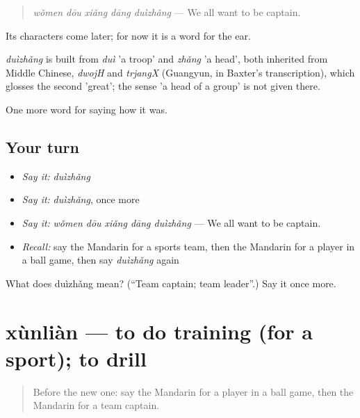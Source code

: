 \begin{quote}
\emph{wǒmen dōu xiǎng dāng duìzhǎng} — We all want to be captain.
\end{quote}

Its characters come later; for now it is a word for the ear.

\begin{cousinweb}
\emph{duìzhǎng} is built from \emph{duì} 'a troop' and \emph{zhǎng} 'a head', both inherited from Middle Chinese, \emph{dwojH} and \emph{trjangX} (Guangyun, in Baxter's transcription), which glosses the second 'great'; the sense 'a head of a group' is not given there.
\end{cousinweb}

\begin{grammarlens}[title={What you've built}]
One more word for saying how it was.
\end{grammarlens}

\subsection*{Your turn}
\begin{itemize}
\raggedright
  \item \emph{Say it:} \emph{duìzhǎng}
  \item \emph{Say it:} \emph{duìzhǎng}, once more
  \item \emph{Say it:} \emph{wǒmen dōu xiǎng dāng duìzhǎng} — We all want to be captain.
  \item \emph{Recall:} say the Mandarin for a sports team, then the Mandarin for a player in a ball game, then say \emph{duìzhǎng} again
\end{itemize}

\begin{tcolorbox}[breakable,colback=teal!4,colframe=teal!35!black,title={Before you move on}]
What does duìzhǎng mean? (\textquotedblleft{}Team captain; team leader\textquotedblright{}.) Say it once more.
\end{tcolorbox}
\section[xùnliàn]{xùnliàn — to do training (for a sport); to drill}

\label{lesson:ZH-C499-xunlian}



\begin{quote}
Before the new one: say the Mandarin for a player in a ball game, then the Mandarin for a team captain.
\end{quote}

